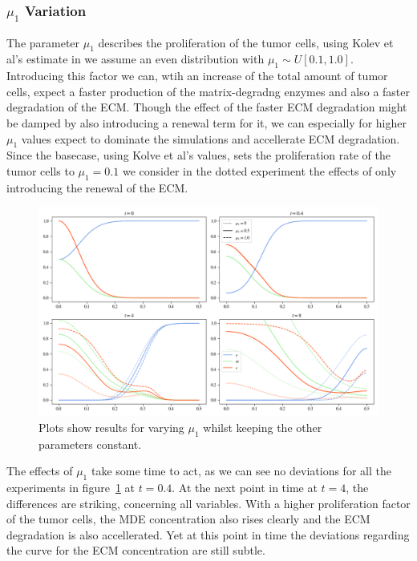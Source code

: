 \subsubsection*{$\mu_1$ Variation}
The parameter $\mu_1$ describes the proliferation of the tumor cells, using Kolev et al's estimate in \cite{Kolev2010} we assume an even distribution with $\mu_1 \sim U[0.1, 1.0]$. Introducing this factor we can, wtih an increase of the total amount of tumor cells, expect a faster production of the matrix-degradng enzymes and also a faster degradation of the ECM. Though the effect of the faster ECM degradation might be damped by also introducing a renewal term for it, we can especially for higher $\mu_1$ values expect to dominate the simulations and accellerate ECM degradation.\newline
Since the basecase, using Kolve et al's values, sets the proliferation rate of the tumor cells to $\mu_1=0.1$ we consider in the dotted experiment the effects of only introducing the renewal of the ECM.\newline
\begin{figure}[h]
    \centering
    \includegraphics[width=\textwidth]{resources/images/prolif_mu_1_variation.png}
    \caption{Plots show results for varying $\mu_1$ whilst keeping the other parameters constant.}
    \label{fig:prolif_mu_1_variation}
\end{figure}
The effects of $\mu_1$ take some time to act, as we can see no deviations for all the experiments in figure~\ref{fig:prolif_mu_1_variation} at $t=0.4$.\newline
At the next point in time at $t=4$, the differences are striking, concerning all variables. With a higher proliferation factor of the tumor cells, the MDE concentration also rises clearly and the ECM degradation is also accellerated. Yet at this point in time the deviations regarding the curve for the ECM concentration are still subtle.\newline 
